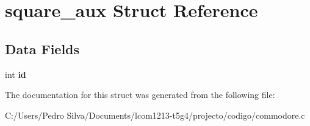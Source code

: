 \hypertarget{structsquare__aux}{\section{square\-\_\-aux Struct Reference}
\label{structsquare__aux}
}
\subsection*{Data Fields}
\begin{DoxyCompactItemize}
\item 
\hypertarget{structsquare__aux_a7441ef0865bcb3db9b8064dd7375c1ea}{int {\bfseries id}}\label{structsquare__aux_a7441ef0865bcb3db9b8064dd7375c1ea}

\end{DoxyCompactItemize}


The documentation for this struct was generated from the following file\-:\begin{DoxyCompactItemize}
\item 
C\-:/\-Users/\-Pedro Silva/\-Documents/lcom1213-\/t5g4/projecto/codigo/commodore.\-c\end{DoxyCompactItemize}
